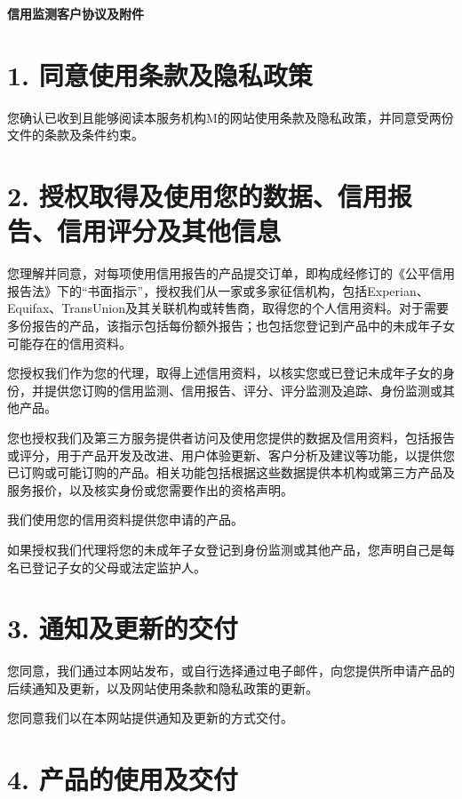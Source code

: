 \documentclass[UTF8,fontset=none,11pt,a4paper]{ctexart}
\begin{document}
{\noindent\fontsize{20}{25}\selectfont\bfseries 信用监测客户协议及附件\par}
\vspace{10pt}
\section*{1. 同意使用条款及隐私政策}
您确认已收到且能够阅读本服务机构M的网站使用条款及隐私政策，并同意受两份文件的条款及\allowbreak\mbox{条件约束。}


\section*{2. 授权取得及使用您的数据、信用报告、信用评分及其他信息}
您理解并同意，对每项使用信用报告的产品提交订单，即构成经修订的《公平信用报告法》下的“书面指示”，授权我们从一家或多家征信机构，包括Experian、Equifax、TransUnion及其关联机构或转售商，取得您的个人信用资料。对于需要多份报告的产品，该指示包括每份额外报告；也包括您登记到产品中的未成年子女可能存在的\allowbreak\mbox{信用资料。}


您授权我们作为您的代理，取得上述信用资料，以核实您或已登记未成年子女的身份，并提供您订购的信用监测、信用报告、评分、评分监测及追踪、身份监测或\allowbreak\mbox{其他产品。}


您也授权我们及第三方服务提供者访问及使用您提供的数据及信用资料，包括报告或评分，用于产品开发及改进、用户体验更新、客户分析及建议等功能，以提供您已订购或可能订购的产品。相关功能包括根据这些数据提供本机构或第三方产品及服务报价，以及核实身份或您需要作出的\allowbreak\mbox{资格声明。}


我们使用您的信用资料提供您申\allowbreak\mbox{请的产品。}


如果授权我们代理将您的未成年子女登记到身份监测或其他产品，您声明自己是每名已登记子女的父母或法\allowbreak\mbox{定监护人。}


\section*{3. 通知及更新的交付}
您同意，我们通过本网站发布，或自行选择通过电子邮件，向您提供所申请产品的后续通知及更新，以及网站使用条款和隐私政\allowbreak\mbox{策的更新。}


您同意我们以在本网站提供通知及更新的\allowbreak\mbox{方式交付。}


\section*{4. 产品的使用及交付}
\end{document}
